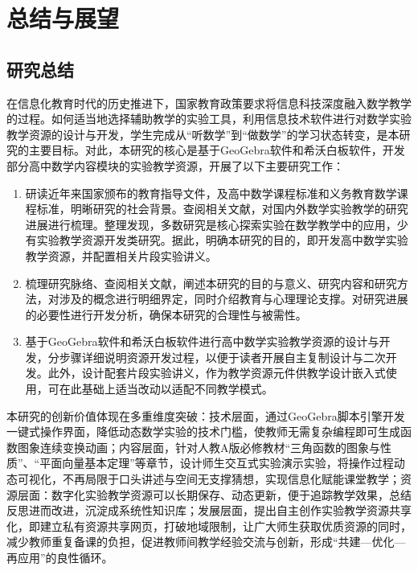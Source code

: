 
\chapter{总结与展望}
\section{研究总结}
在信息化教育时代的历史推进下，国家教育政策要求将信息科技深度融入数学教学的过程。如何适当地选择辅助教学的实验工具，利用信息技术软件进行对数学实验教学资源的设计与开发，学生完成从“听数学”到“做数学”的学习状态转变，是本研究的主要目标。对此，本研究的核心是基于GeoGebra软件和希沃白板软件，开发部分高中数学内容模块的实验教学资源，开展了以下主要研究工作：
\begin{enumerate}[(1)]
  \item 研读近年来国家颁布的教育指导文件，及高中数学课程标准和义务教育数学课程标准，明晰研究的社会背景。查阅相关文献，对国内外数学实验教学的研究进展进行梳理。整理发现，多数研究是核心探索实验在数学教学中的应用，少有实验教学资源开发类研究。据此，明确本研究的目的，即开发高中数学实验教学资源，并配置相关片段实验讲义。
  \item 梳理研究脉络、查阅相关文献，阐述本研究的目的与意义、研究内容和研究方法，对涉及的概念进行明细界定，同时介绍教育与心理理论支撑。对研究进展的必要性进行开发分析，确保本研究的合理性与被需性。
  \item 基于GeoGebra软件和希沃白板软件进行高中数学实验教学资源的设计与开发，分步骤详细说明资源开发过程，以便于读者开展自主复制设计与二次开发。此外，设计配套片段实验讲义，作为教学资源元件供教学设计嵌入式使用，可在此基础上适当改动以适配不同教学模式。
\end{enumerate}

本研究的创新价值体现在多重维度突破：技术层面，通过GeoGebra脚本引擎开发一键式操作界面，降低动态数学实验的技术门槛，使教师无需复杂编程即可生成函数图象连续变换动画；内容层面，针对人教A版必修教材“三角函数的图象与性质”、“平面向量基本定理”等章节，设计师生交互式实验演示实验，将操作过程动态可视化，不再局限于口头讲述与空间无支撑猜想，实现信息化赋能课堂教学；资源层面：数字化实验教学资源可以长期保存、动态更新，便于追踪教学效果，总结反思进而改进，沉淀成系统性知识库；发展层面，提出自主创作实验教学资源共享化，即建立私有资源共享网页，打破地域限制，让广大师生获取优质资源的同时，减少教师重复备课的负担，促进教师间教学经验交流与创新，形成“共建—优化—再应用”的良性循环。

